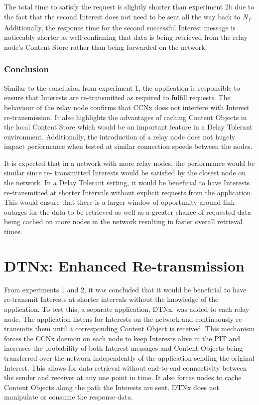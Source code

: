 \documentclass[a4paper,12pt]{report}      %
\begin{document}
The total time to satisfy the request is slightly shorter than experiment 2b due to the fact that the second
Interest does not need to be sent all the way back to \emph{N\textsubscript{1}}. Additionally, the response time for
the second successful Interest message is noticeably shorter as well confirming that data is being
retrieved from the relay node's Content Store rather than being forwarded on the network.

\subsubsection{Conclusion}

Similar to the conclusion from experiment 1, the application is responsible to ensure that Interests are
re-transmitted as required to fulfill requests. The behaviour of the relay node confirms that CCNx does
not interfere with Interest re-transmission. It also highlights the advantages of caching Content Objects
in the local Content Store which would be an important feature in a Delay Tolerant environment.
Additionally, the introduction of a relay node does not hugely impact performance when tested at
similar connection speeds between the nodes.

It is expected that in a network with more relay nodes, the performance would be similar since re-
transmitted Interests would be satisfied by the closest node on the network. In a Delay Tolerant setting,
it would be beneficial to have Interests re-transmitted at shorter Intervals without explicit requests from
the application. This would ensure that there is a larger window of opportunity around link outages for
the data to be retrieved as well as a greater chance of requested data being cached on more nodes in the
network resulting in faster overall retrieval times.


\pagebreak
\section{DTNx: Enhanced Re-transmission}

From experiments 1 and 2, it was concluded that it would be beneficial to have re-transmit Interests at
shorter intervals without the knowledge of the application. To test this, a separate application, DTNx,
was added to each relay node. The application listens for Interests on the network and continuously re-transmits them until
a corresponding Content Object is received. This mechanism forces the CCNx daemon on each node to keep Interests alive in the PIT 
and increases the probability of both Interest messages and Content Objects being transferred over the network independently of the application sending the original Interest. This allows for data retrieval without end-to-end connectivity between the sender and receiver at any one point in time. It also forces nodes to cache Content Objects along the path the Interests  are sent. DTNx does not manipulate or consume the response data.
\end{document}
